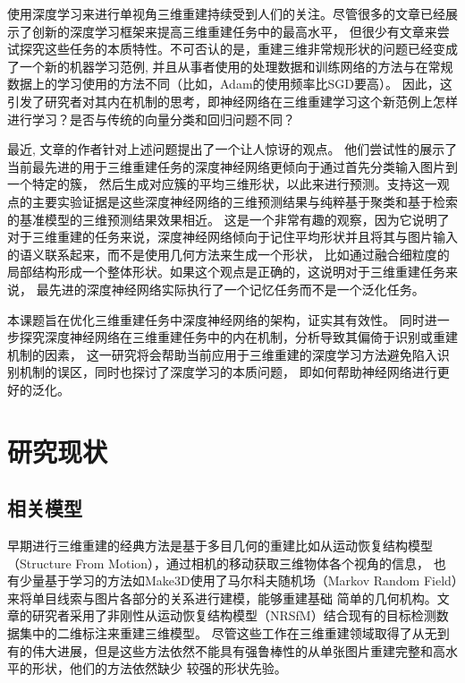 \documentclass[bachelor, nocolorlinks, printoneside]{seuthesis} %
\begin{document}
\begin{Main}
\FloatBarrier

使用深度学习来进行单视角三维重建持续受到人们的关注。尽管很多的文章已经展示了创新的深度学习框架来提高三维重建任务中的最高水平\cite{li2018point,park2019deepsdf,fan2017point,tatarchenko2017octree,groueix2018papier,yang2018foldingnet,wang2018pixel2mesh,sun2018pix3d,tulsiani2017multi,wu2017marrnet,yan2016perspective}，
但很少有文章来尝试探究这些任务的本质特性。不可否认的是，重建三维非常规形状的问题已经变成了一个新的机器学习范例, 
并且从事者使用的处理数据和训练网络的方法与在常规数据上的学习使用的方法不同（比如，Adam\cite{kingma2014adam}的使用频率比SGD要高）。
因此，这引发了研究者对其内在机制的思考，即神经网络在三维重建学习这个新范例上怎样进行学习？是否与传统的向量分类和回归问题不同？

最近, 文章\cite{tatarchenko2019single}的作者针对上述问题提出了一个让人惊讶的观点。
他们尝试性的展示了当前最先进的用于三维重建任务的深度神经网络更倾向于通过首先分类输入图片到一个特定的簇，
然后生成对应簇的平均三维形状，以此来进行预测。支持这一观点的主要实验证据是这些深度神经网络的三维预测结果与纯粹基于聚类和基于检索的基准模型的三维预测结果效果相近。
这是一个非常有趣的观察，因为它说明了对于三维重建的任务来说，深度神经网络倾向于记住平均形状并且将其与图片输入的语义联系起来，而不是使用几何方法来生成一个形状，
比如通过融合细粒度的局部结构形成一个整体形状。如果这个观点是正确的，这说明对于三维重建任务来说，
最先进的深度神经网络实际执行了一个记忆任务而不是一个泛化任务\cite{arpit2017closer}。

本课题旨在优化三维重建任务中深度神经网络的架构，证实其有效性。
同时进一步探究深度神经网络在三维重建任务中的内在机制，分析导致其偏倚于识别或重建机制的因素，
这一研究将会帮助当前应用于三维重建的深度学习方法避免陷入识别机制的误区，同时也探讨了深度学习的本质问题，
即如何帮助神经网络进行更好的泛化。



\section{研究现状}
\subsection{相关模型}
早期进行三维重建的经典方法是基于多目几何的重建比如从运动恢复结构模型\cite{Hming2010TheSR}（Structure From Motion），通过相机的移动获取三维物体各个视角的信息，
也有少量基于学习的方法如Make3D使用了马尔科夫随机场\cite{10.1109/TPAMI.2008.132}（Markov Random Field）来将单目线索与图片各部分的关系进行建模，能够重建基础
简单的几何机构。文章\cite{Kar_2015}的研究者采用了非刚性从运动恢复结构模型（NRSfM）结合现有的目标检测数据集中的二维标注来重建三维模型。
尽管这些工作在三维重建领域取得了从无到有的伟大进展，但是这些方法依然不能具有强鲁棒性的从单张图片重建完整和高水平的形状，他们的方法依然缺少
较强的形状先验。


\end{Main}
\end{document}

